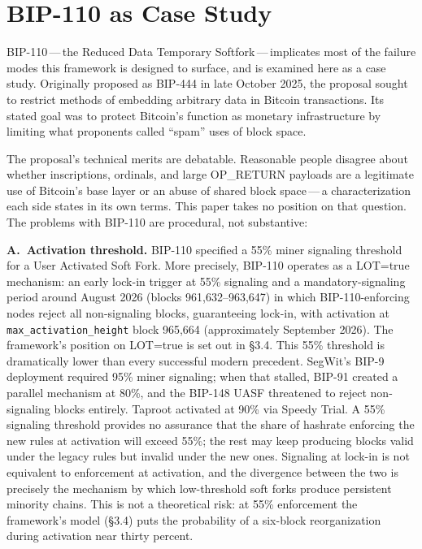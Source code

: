\documentclass[11pt, twoside, openright]{book}
\newcommand{\reqitem}[2]{\medskip\noindent\textbf{#1\ #2}\quad\ignorespaces}
\newcommand{\sect}[1]{\S#1}
\begin{document}
\section{BIP-110 as Case Study}

BIP-110\,---\,the Reduced Data Temporary Softfork\,---\,implicates most of the failure modes this framework is designed to surface, and is examined here as a case study. Originally proposed as BIP-444 in late October 2025, the proposal sought to restrict methods of embedding arbitrary data in Bitcoin transactions. Its stated goal was to protect Bitcoin's function as monetary infrastructure by limiting what proponents called ``spam'' uses of block space.

The proposal's technical merits are debatable. Reasonable people disagree about whether inscriptions, ordinals, and large OP\_RETURN payloads are a legitimate use of Bitcoin's base layer or an abuse of shared block space\,---\,a characterization each side states in its own terms. This paper takes no position on that question. The problems with BIP-110 are procedural, not substantive:

\reqitem{A.}{Activation threshold.} BIP-110 specified a 55\% miner signaling threshold for a User Activated Soft Fork. More precisely, BIP-110 operates as a LOT=true mechanism: an early lock-in trigger at 55\% signaling and a mandatory-signaling period around August 2026 (blocks 961{,}632--963{,}647) in which BIP-110-enforcing nodes reject all non-signaling blocks, guaranteeing lock-in, with activation at \texttt{max\_activation\_height} block 965{,}664 (approximately September 2026). The framework's position on LOT=true is set out in \sect{3.4}. This 55\% threshold is dramatically lower than every successful modern precedent. SegWit's BIP-9 deployment required 95\% miner signaling; when that stalled, BIP-91 created a parallel mechanism at 80\%, and the BIP-148 UASF threatened to reject non-signaling blocks entirely. Taproot activated at 90\% via Speedy Trial. A 55\% signaling threshold provides no assurance that the share of hashrate enforcing the new rules at activation will exceed 55\%; the rest may keep producing blocks valid under the legacy rules but invalid under the new ones. Signaling at lock-in is not equivalent to enforcement at activation, and the divergence between the two is precisely the mechanism by which low-threshold soft forks produce persistent minority chains. This is not a theoretical risk: at 55\% enforcement the framework's model (\sect{3.4}) puts the probability of a six-block reorganization during activation near thirty percent.
\end{document}
